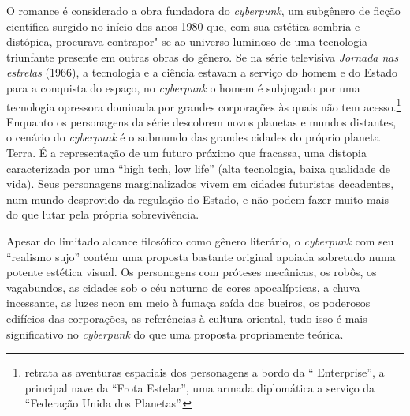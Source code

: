 O romance é considerado a obra fundadora do \emph{cyberpunk}, um
subgênero de ficção científica surgido no início dos anos 1980 que, com
sua estética sombria e distópica, procurava contrapor"-se ao universo
luminoso de uma tecnologia triunfante presente em outras obras do
gênero. Se na série televisiva \emph{Jornada nas estrelas} (1966), a
tecnologia e a ciência estavam a serviço do homem e do Estado para a
conquista do espaço, no \emph{cyberpunk} o homem é subjugado por uma
tecnologia opressora dominada por grandes corporações às quais não tem
acesso.\footnote{{} retrata as aventuras
  espaciais dos personagens a bordo da `` Enterprise'', a principal
  nave da ``Frota Estelar'', uma armada diplomática a serviço da
  ``Federação Unida dos Planetas''.} Enquanto os personagens da série
descobrem novos planetas e mundos distantes, o cenário do
\emph{cyberpunk} é o submundo das grandes cidades do próprio planeta
Terra. É a representação de um futuro próximo que fracassa, uma distopia
caracterizada por uma ``high tech, low life'' (alta tecnologia, baixa
qualidade de vida). Seus personagens marginalizados vivem em cidades
futuristas decadentes, num mundo desprovido da regulação do Estado, e
não podem fazer muito mais do que lutar pela própria sobrevivência.

Apesar do limitado alcance filosófico como gênero literário, o 
\emph{cyberpunk} com seu ``realismo sujo'' contém uma proposta bastante
original apoiada sobretudo numa potente estética visual. Os personagens
com próteses mecânicas, os robôs, os vagabundos, as cidades sob o céu
noturno de cores apocalípticas, a chuva incessante, as luzes neon em
meio à fumaça saída dos bueiros, os poderosos edifícios das corporações,
as referências à cultura oriental, tudo isso é mais significativo no
\emph{cyberpunk} do que uma proposta propriamente teórica.

\label{cyberpunk}

